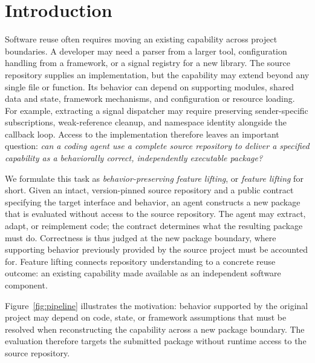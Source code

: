 \documentclass[acmsmall,screen,review,anonymous,nonacm]{acmart}
\begin{document}
\section{Introduction}
\label{sec:introduction}

Software reuse often requires moving an existing capability across project
boundaries. A developer may need a parser from a larger tool, configuration
handling from a framework, or a signal registry for a new library. The source
repository supplies an implementation, but the capability may extend beyond
any single file or function. Its behavior can depend on supporting modules,
shared data and state, framework mechanisms, and configuration or resource
loading. For example, extracting a signal dispatcher may require preserving
sender-specific subscriptions, weak-reference cleanup, and namespace identity
alongside the callback loop. Access to the implementation therefore leaves an
important question: \emph{can a coding agent use a complete source repository
to deliver a specified capability as a behaviorally correct, independently
executable package?}

We formulate this task as \emph{behavior-preserving feature lifting}, or
\emph{feature lifting} for short. Given an intact, version-pinned source
repository and a public contract specifying the target interface and behavior,
an agent constructs a new package that is evaluated without access to the
source repository. The agent may extract, adapt, or reimplement code; the
contract determines what the resulting package must do. Correctness is thus
judged at the new package boundary, where supporting behavior previously
provided by the source project must be accounted for. Feature lifting connects
repository understanding to a concrete reuse outcome: an existing capability
made available as an independent software component.

Figure~\ref{fig:pipeline} illustrates the motivation: behavior supported by the
original project may depend on code, state, or framework assumptions that must
be resolved when reconstructing the capability across a new package boundary.
The evaluation therefore targets the submitted package without runtime access
to the source repository.
\end{document}
